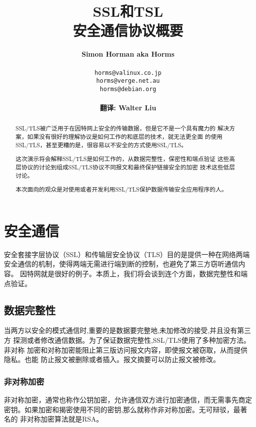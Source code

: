 \documentclass[11pt,dvips]{article}
\title{SSL和TSL\\
安全通信协议概要}
\author{\textbf{Simon Horman aka Horms} \\
        \\
\texttt{horms@valinux.co.jp}\\
\texttt{horms@verge.net.au}\\
\texttt{horms@debian.org}\\
\\
\textbf{翻译: Walter Liu}\\
}
\date{}
\begin{document}
\maketitle
\pagebreak

\begin{abstract}

          SSL/TLS被广泛用于在因特网上安全的传输数据，但是它不是一个具有魔力的
        解决方案，如果没有很好的理解协议是如何工作的和底层的技术，就无法更全面
        的使用SSL/TLS，甚至更糟的是，很容易以不安全的方式使用SSL/TLS。

        这次演示将会解释SSL/TLS是如何工作的，从数据完整性，保密性和端点验证
        这些高层协议的讨论到组成SSL/TLS协议不同报文和最终保护链接安全的加密
        技术这些低层讨论。

        本次面向的观众是对使用或者开发利用SSL/TLS保护数据传输安全应用程序的人。


\end{abstract}

\tableofcontents

\section{安全通信}

安全套接字层协议（SSL）和传输层安全协议（TLS）目的是提供一种在网络两端
安全通信的机制，使得两端无需进行端到断的控制，也避免了第三方窃听通信内容。
因特网就是很好的例子。本质上，我们将会谈到连个方面，数据完整性和端点验证。
\\

\subsection{数据完整性}
当两方以安全的模式通信时,重要的是数据要完整地,未加修改的接受,并且没有第三方
探测或者修改通信数据。为了保证数据完整性,SSL/TLS使用了多种加密方法。非对称
加密和对称加密能阻止第三版访问报文内容，即使报文被窃取，从而提供隐私。也能
防止报文被删除或者插入。报文摘要可以防止报文被修改。\\

\subsubsection{非对称加密}
非对称加密，通常也称作公钥加密，允许通信双方进行加密通信，而无需事先商定
密钥。如果加密和揭密使用不同的密钥,那么就称作非对称加密。无可辩驳，最著名的
非对称加密算法就是RSA。\\
\end{document}
